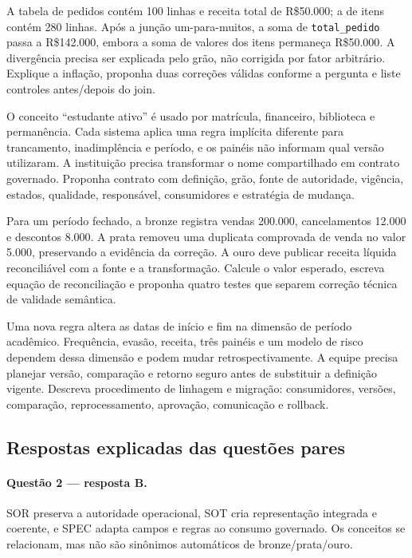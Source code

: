 \TextoBase A tabela de pedidos contém 100 linhas e receita total de R\$50.000; a de itens contém 280 linhas. Após a junção um-para-muitos, a soma de \texttt{total\_pedido} passa a R\$142.000, embora a soma de valores dos itens permaneça R\$50.000. A divergência precisa ser explicada pelo grão, não corrigida por fator arbitrário.
\FonteDidatica
\Comando Explique a inflação, proponha duas correções válidas conforme a pergunta e liste controles antes/depois do join.

\TextoBase O conceito ``estudante ativo'' é usado por matrícula, financeiro, biblioteca e permanência. Cada sistema aplica uma regra implícita diferente para trancamento, inadimplência e período, e os painéis não informam qual versão utilizaram. A instituição precisa transformar o nome compartilhado em contrato governado.
\FonteDidatica
\Comando Proponha contrato com definição, grão, fonte de autoridade, vigência, estados, qualidade, responsável, consumidores e estratégia de mudança.

\TextoBase Para um período fechado, a bronze registra vendas 200.000, cancelamentos 12.000 e descontos 8.000. A prata removeu uma duplicata comprovada de venda no valor 5.000, preservando a evidência da correção. A ouro deve publicar receita líquida reconciliável com a fonte e a transformação.
\FonteDidatica
\Comando Calcule o valor esperado, escreva equação de reconciliação e proponha quatro testes que separem correção técnica de validade semântica.

\TextoBase Uma nova regra altera as datas de início e fim na dimensão de período acadêmico. Frequência, evasão, receita, três painéis e um modelo de risco dependem dessa dimensão e podem mudar retrospectivamente. A equipe precisa planejar versão, comparação e retorno seguro antes de substituir a definição vigente.
\FonteDidatica
\Comando Descreva procedimento de linhagem e migração: consumidores, versões, comparação, reprocessamento, aprovação, comunicação e rollback.

\newpage\subsection{Respostas explicadas das questões pares}
\paragraph{Questão 2 — resposta B.} SOR preserva a autoridade operacional, SOT cria representação integrada e coerente, e SPEC adapta campos e regras ao consumo governado. Os conceitos se relacionam, mas não são sinônimos automáticos de bronze/prata/ouro.
